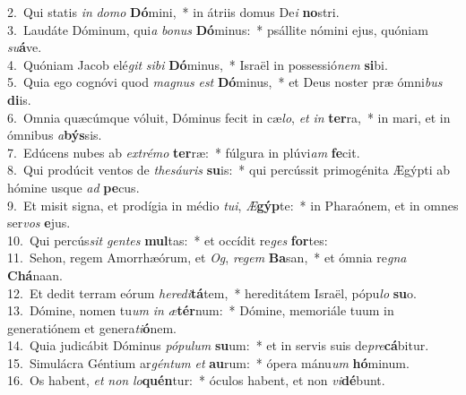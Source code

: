 {2.~}Qui statis \textit{in} \textit{do}\textit{mo} \textbf{Dó}mini,~* in átriis domus De\textit{i} \textbf{no}stri.\\
{3.~}Laudáte Dóminum, qui\textit{a} \textit{bo}\textit{nus} \textbf{Dó}minus:~* psállite nómini ejus, quóniam \textit{su}\textbf{á}ve.\\
{4.~}Quóniam Jacob elé\textit{git} \textit{si}\textit{bi} \textbf{Dó}minus,~* Israël in possessió\textit{nem} \textbf{si}bi.\\
{5.~}Quia ego cognóvi quod \textit{ma}\textit{gnus} \textit{est} \textbf{Dó}minus,~* et Deus noster præ ómni\textit{bus} \textbf{di}is.\\
{6.~}Omnia quæcúmque vóluit, Dóminus fecit in cæ\textit{lo}, \textit{et} \textit{in} \textbf{ter}ra,~* in mari, et in ómnibus \textit{a}\textbf{býs}sis.\\
{7.~}Edúcens nubes ab \textit{ex}\textit{tré}\textit{mo} \textbf{ter}ræ:~* fúlgura in plúvi\textit{am} \textbf{fe}cit.\\
{8.~}Qui prodúcit ventos de \textit{the}\textit{sáu}\textit{ris} \textbf{su}is:~* qui percússit primogénita Ægýpti ab hómine usque \textit{ad} \textbf{pe}cus.\\
{9.~}Et misit signa, et prodígia in médio \textit{tu}\textit{i}, \textit{Æ}\textbf{gýp}te:~* in Pharaónem, et in omnes ser\textit{vos} \textbf{e}jus.\\
{10.~}Qui percús\textit{sit} \textit{gen}\textit{tes} \textbf{mul}tas:~* et occídit re\textit{ges} \textbf{for}tes:\\
{11.~}Sehon, regem Amorrhæórum, et \textit{Og}, \textit{re}\textit{gem} \textbf{Ba}san,~* et ómnia re\textit{gna} \textbf{Chá}naan.\\
{12.~}Et dedit terram eórum \textit{he}\textit{re}\textit{di}\textbf{tá}tem,~* hereditátem Israël, pópu\textit{lo} \textbf{su}o.\\
{13.~}Dómine, nomen tu\textit{um} \textit{in} \textit{æ}\textbf{tér}num:~* Dómine, memoriále tuum in generatiónem et genera\textit{ti}\textbf{ó}nem.\\
{14.~}Quia judicábit Dóminus \textit{pó}\textit{pu}\textit{lum} \textbf{su}um:~* et in servis suis de\textit{pre}\textbf{cá}bitur.\\
{15.~}Simulácra Géntium ar\textit{gén}\textit{tum} \textit{et} \textbf{au}rum:~* ópera mánu\textit{um} \textbf{hó}minum.\\
{16.~}Os habent, \textit{et} \textit{non} \textit{lo}\textbf{quén}tur:~* óculos habent, et non \textit{vi}\textbf{dé}bunt.\\
